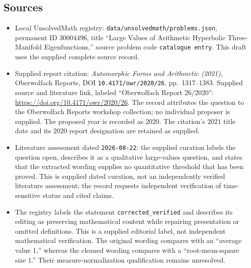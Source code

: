 \documentclass[11pt]{article}
\begin{document}
\subsection{Sources}
\begin{itemize}
\item Local UnsolvedMath registry: \texttt{data/unsolvedmath/problems.json}, permanent ID \(30004496\), title ``Large Values of Arithmetic Hyperbolic Three-Manifold Eigenfunctions,'' source problem code \texttt{catalogue entry}. This draft uses the supplied complete source record.
\item Supplied report citation: \emph{Automorphic Forms and Arithmetic (2021)}, Oberwolfach Reports, DOI \texttt{10.4171/owr/2020/26}, pp.~1317--1383. Supplied source and literature link, labeled ``Oberwolfach Report 26/2020'': \url{https://doi.org/10.4171/owr/2020/26}. The record attributes the question to the Oberwolfach Reports workshop collection; no individual proposer is supplied. The proposed year is recorded as \(2020\). The citation's \(2021\) title date and its \(2020\) report designation are retained as supplied.
\item Literature assessment dated \texttt{2026-08-22}: the supplied curation labels the question open, describes it as a qualitative large-values question, and states that the extracted wording supplies no quantitative threshold that has been proved. This is supplied dated curation, not an independently verified literature assessment; the record requests independent verification of time-sensitive status and cited claims.
\item The registry labels the statement \texttt{corrected\_verified} and describes its editing as preserving mathematical content while repairing presentation or omitted definitions. This is a supplied editorial label, not independent mathematical verification. The original wording compares with an ``average value 1,'' whereas the cleaned wording compares with a ``root-mean-square size 1.'' Their measure-normalization qualification remains unresolved.
\end{itemize}
\end{document}
